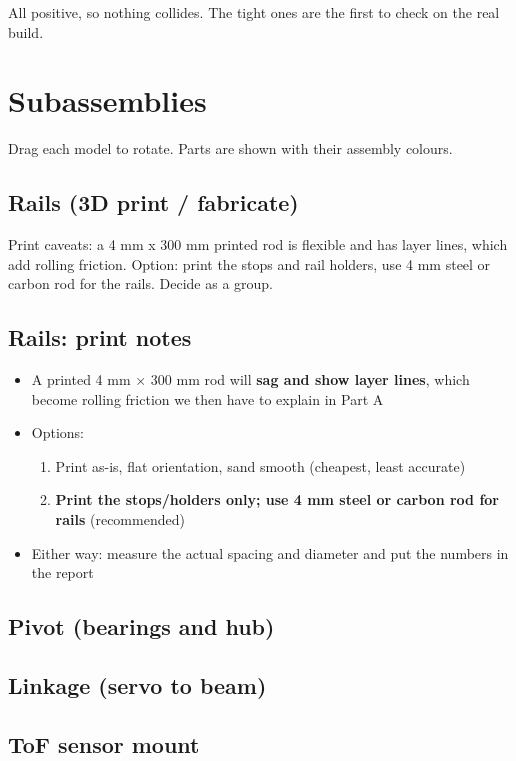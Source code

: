 \documentclass[11pt]{article}
\begin{document}
All positive, so nothing collides. The tight ones are the first to check on the real build.
\section*{Subassemblies}
\label{sec:orgd513b66}
Drag each model to rotate. Parts are shown with their assembly colours.
\subsection*{Rails (3D print / fabricate)}
\label{sec:org46b4968}
\begin{NOTES}
Print caveats: a 4 mm x 300 mm printed rod is flexible and has layer lines, which add rolling friction. Option: print the stops and rail holders, use 4 mm steel or carbon rod for the rails. Decide as a group.
\end{NOTES}
\subsection*{Rails: print notes}
\label{sec:orgd63e972}
\begin{itemize}
\item A printed 4 mm × 300 mm rod will \textbf{sag and show layer lines}, which become rolling friction we then have to explain in Part A
\item Options:
\begin{enumerate}
\item Print as-is, flat orientation, sand smooth (cheapest, least accurate)
\item \textbf{Print the stops/holders only; use 4 mm steel or carbon rod for rails} (recommended)
\end{enumerate}
\item Either way: measure the actual spacing and diameter and put the numbers in the report
\end{itemize}
\subsection*{Pivot (bearings and hub)}
\label{sec:org69a025d}
\subsection*{Linkage (servo to beam)}
\label{sec:org572e45b}
\subsection*{ToF sensor mount}
\label{sec:org50bc999}
\end{document}
